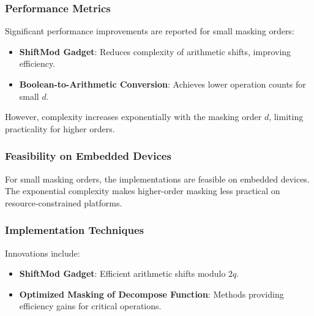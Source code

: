 \subsubsection{Performance Metrics}

Significant performance improvements are reported for small masking orders:

\begin{itemize}
    \item \textbf{ShiftMod Gadget}: Reduces complexity of arithmetic shifts, improving efficiency.
    \item \textbf{Boolean-to-Arithmetic Conversion}: Achieves lower operation counts for small $d$.
\end{itemize}

However, complexity increases exponentially with the masking order $d$, limiting practicality for higher orders.

\subsubsection{Feasibility on Embedded Devices}

For small masking orders, the implementations are feasible on embedded devices. The exponential complexity makes higher-order masking less practical on resource-constrained platforms.

\subsubsection{Implementation Techniques}

Innovations include:

\begin{itemize}
    \item \textbf{ShiftMod Gadget}: Efficient arithmetic shifts modulo $2q$.
    \item \textbf{Optimized Masking of Decompose Function}: Methods providing efficiency gains for critical operations.
\end{itemize}